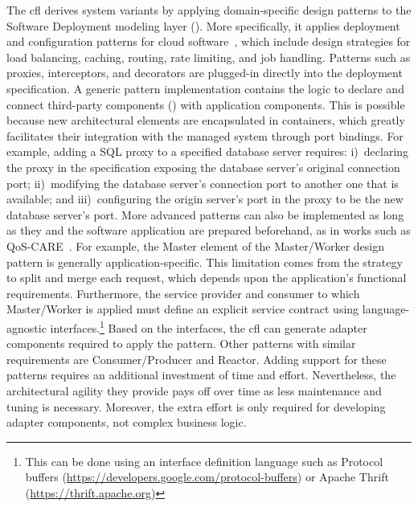 The \gls{cfl} derives system variants by applying domain-specific design patterns to the Software Deployment modeling layer (). More specifically, it applies deployment and configuration patterns for cloud software~\cite{homer-2014-cloud,erl-2015-cloud}, which include design strategies for load balancing, caching, routing, rate limiting, and job handling. Patterns such as proxies, interceptors, and decorators are plugged-in directly into the deployment specification. A generic pattern implementation contains the logic to declare and connect third-party components () with application components. This is possible because new architectural elements are encapsulated in containers, which greatly facilitates their integration with the managed system through port bindings. For example, adding a SQL proxy to a specified database server requires: i)~declaring the proxy in the specification exposing the database server's original connection port; ii)~modifying the database server's connection port to another one that is available; and iii)~configuring the origin server's port in the proxy to be the new database server's port. More advanced patterns can also be implemented as long as they and the software application are prepared beforehand, as in works such as QoS-CARE~\cite{tamura-2012-qos-care}. For example, the Master element of the Master/Worker design pattern is generally application-specific. This limitation comes from the strategy to split and merge each request, which depends upon the application's functional requirements. Furthermore, the service provider and consumer to which Master/Worker is applied must define an explicit service contract using language-agnostic interfaces.\footnote{This can be done using an interface definition language such as Protocol buffers (\url{https://developers.google.com/protocol-buffers}) or Apache Thrift (\url{https://thrift.apache.org})} Based on the interfaces, the \gls{cfl} can generate adapter components required to apply the pattern. Other patterns with similar requirements are Consumer/Producer and Reactor. Adding support for these patterns requires an additional investment of time and effort. Nevertheless, the architectural agility they provide pays off over time as less maintenance and tuning is necessary. Moreover, the extra effort is only required for developing adapter components, not complex business logic.

